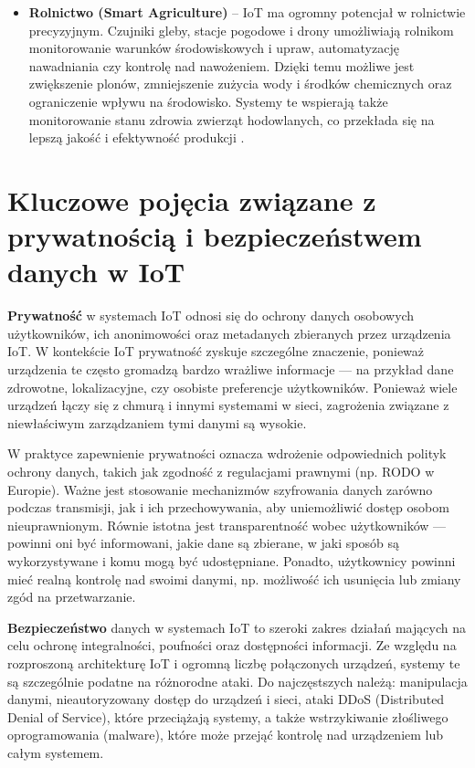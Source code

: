 \begin{itemize}
    \item \textbf{Rolnictwo (Smart Agriculture)} – IoT ma ogromny potencjał w rolnictwie precyzyjnym. Czujniki gleby, stacje pogodowe i drony umożliwiają rolnikom monitorowanie warunków środowiskowych i upraw, automatyzację nawadniania czy kontrolę nad nawożeniem. Dzięki temu możliwe jest zwiększenie plonów, zmniejszenie zużycia wody i środków chemicznych oraz ograniczenie wpływu na środowisko. Systemy te wspierają także monitorowanie stanu zdrowia zwierząt hodowlanych, co przekłada się na lepszą jakość i efektywność produkcji \cite{wolfert2017big}.
\end{itemize}

\section{Kluczowe pojęcia związane z prywatnością i bezpieczeństwem danych w IoT}
\textbf{Prywatność} w systemach IoT odnosi się do ochrony danych osobowych użytkowników, ich anonimowości oraz metadanych zbieranych przez urządzenia IoT. W kontekście IoT prywatność zyskuje szczególne znaczenie, ponieważ urządzenia te często gromadzą bardzo wrażliwe informacje — na przykład dane zdrowotne, lokalizacyjne, czy osobiste preferencje użytkowników. Ponieważ wiele urządzeń łączy się z chmurą i innymi systemami w sieci, zagrożenia związane z niewłaściwym zarządzaniem tymi danymi są wysokie.

W praktyce zapewnienie prywatności oznacza wdrożenie odpowiednich polityk ochrony danych, takich jak zgodność z regulacjami prawnymi (np. RODO w Europie). Ważne jest stosowanie mechanizmów szyfrowania danych zarówno podczas transmisji, jak i ich przechowywania, aby uniemożliwić dostęp osobom nieuprawnionym. Równie istotna jest transparentność wobec użytkowników — powinni oni być informowani, jakie dane są zbierane, w jaki sposób są wykorzystywane i komu mogą być udostępniane. Ponadto, użytkownicy powinni mieć realną kontrolę nad swoimi danymi, np. możliwość ich usunięcia lub zmiany zgód na przetwarzanie.

\textbf{Bezpieczeństwo} danych w systemach IoT to szeroki zakres działań mających na celu ochronę integralności, poufności oraz dostępności informacji. Ze względu na rozproszoną architekturę IoT i ogromną liczbę połączonych urządzeń, systemy te są szczególnie podatne na różnorodne ataki. Do najczęstszych należą: manipulacja danymi, nieautoryzowany dostęp do urządzeń i sieci, ataki DDoS (Distributed Denial of Service), które przeciążają systemy, a także wstrzykiwanie złośliwego oprogramowania (malware), które może przejąć kontrolę nad urządzeniem lub całym systemem.

